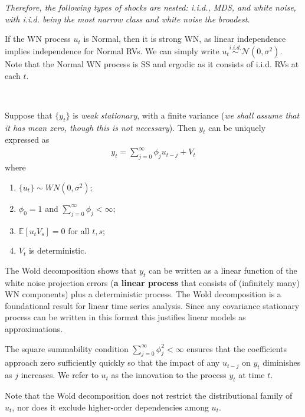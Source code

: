 \textit{Therefore, the following types of shocks are nested: i.i.d., MDS, and white noise,
with i.i.d. being the most narrow class and white noise the broadest.}

If the WN process $u_t$ is Normal, then it is strong WN, as linear independence implies independence for Normal RVs.
We can simply write $u_t \overset{i.i.d.}{\sim} \mathcal{N}(0, \sigma^2)$.
Note that the Normal WN process is SS and ergodic as it consists of i.i.d. RVs at each $t$.

\begin{theorem}\label{thm:wolddecomp}
    \

    Suppose that $\{y_t\}$ is \textit{weak stationary}, with a finite variance (\textit{we shall assume that it has mean zero, though this is not necessary}).
    Then $y_t$ can be uniquely expressed as
    \begin{gather*}
        y_t = \sum_{j=0}^{\infty} \phi_j u_{t-j} + V_t 
    \end{gather*}
    where
    \begin{enumerate}
        \item $\{u_t\} \sim WN(0, \sigma^2)$;
        \item $\phi_0 = 1$ and $\sum_{j=0}^{\infty} \phi_j < \infty$;
        \item $\mathbb{E}[u_t V_s] = 0$ for all $t,s$;
        \item $V_t$ is deterministic.
    \end{enumerate}
\end{theorem}   

The Wold decomposition shows that $y_t$ can be written as a linear function of the white noise projection errors (\textbf{a linear process} that consists of (infinitely many) WN components) plus a deterministic process.
The Wold decomposition is a foundational result for linear time series analysis.
Since any covariance stationary process can be written in this format this justifies linear models as approximations.

The square summability condition $\sum_{j=0}^{\infty} \phi_j^2 < \infty$ ensures that the coefficients approach zero sufficiently quickly so that the impact of any $u_{t-j}$ on $y_t$ diminishes as $j$ increases.
We refer to $u_t$ as the innovation to the process $y_t$ at time $t$.

Note that the Wold decomposition does not restrict the distributional
family of $u_t$, nor does it exclude higher-order dependencies among $u_t$.

